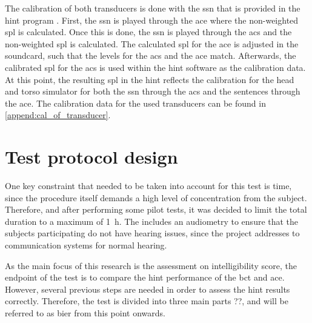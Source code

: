 The calibration of both transducers is done with the \gls{ssn} that is provided in the \gls{hint} program \citep{nilsson_95}. First, the \gls{ssn} is played through the \gls{ace} where the non-weighted \gls{spl} is calculated. Once this is done, the \gls{ssn} is played through the \gls{acs} and the non-weighted \gls{spl} is calculated. The calculated \gls{spl} for the \gls{ace} is adjusted in the soundcard, such that the levels for the \gls{acs} and the \gls{ace} match. Afterwards, the calibrated \gls{spl} for the \gls{acs} is used within the \gls{hint} software as the calibration data. At this point, the resulting \gls{spl}  in the \gls{hint} reflects the calibration for the head and torso simulator for both the \gls{ssn} through the \gls{acs} and the sentences through the \gls{ace}. The calibration data for the used transducers can be found in \autoref{append:cal_of_transducer}.
   
   
   
\section{Test protocol design}
\label{sec:test_protocol_design}   
One key constraint that needed to be taken into account for this test is time, since the procedure itself demands a high level of concentration from the subject. Therefore, and after performing some pilot tests, it was decided to limit the total duration to a maximum of \SI{1}{\hour}. The includes an audiometry to ensure that the subjects participating do not have hearing issues, since the project addresses to communication systems for normal hearing.
 
As the main focus of this research is the assessment on intelligibility score, the endpoint of the test is to compare the \gls{hint} performance of the \gls{bct} and \gls{ace}. However, several previous steps are needed in order to assess the \gls{hint} results correctly. Therefore, the test is divided into three main parts ??, and will be referred to as \gls{bier} from this point onwards. 
 
 
 
